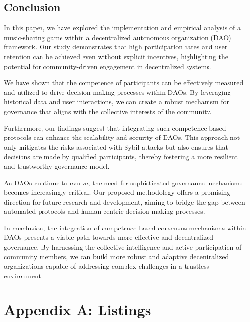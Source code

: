 \documentclass{article}
\begin{document}
\begin{CJK}{UTF8}{gbsn}
\begin{multicols}{2}
        \section{Conclusion}

        In this paper, we have explored the implementation and empirical analysis of a music-sharing game within a decentralized autonomous organization (DAO) framework. Our study demonstrates that high participation rates and user retention can be achieved even without explicit incentives, highlighting the potential for community-driven engagement in decentralized systems.

        We have shown that the competence of participants can be effectively measured and utilized to drive decision-making processes within DAOs. By leveraging historical data and user interactions, we can create a robust mechanism for governance that aligns with the collective interests of the community.

        Furthermore, our findings suggest that integrating such competence-based protocols can enhance the scalability and security of DAOs. This approach not only mitigates the risks associated with Sybil attacks but also ensures that decisions are made by qualified participants, thereby fostering a more resilient and trustworthy governance model.

        As DAOs continue to evolve, the need for sophisticated governance mechanisms becomes increasingly critical. Our proposed methodology offers a promising direction for future research and development, aiming to bridge the gap between automated protocols and human-centric decision-making processes.

        In conclusion, the integration of competence-based consensus mechanisms within DAOs presents a viable path towards more effective and decentralized governance. By harnessing the collective intelligence and active participation of community members, we can build more robust and adaptive decentralized organizations capable of addressing complex challenges in a trustless environment.

        \clearpage
    \end{multicols}
    \appendix
    \section{Appendix A: Listings}
    
    \clearpage
    
    

    \clearpage\end{CJK}
\end{document}
